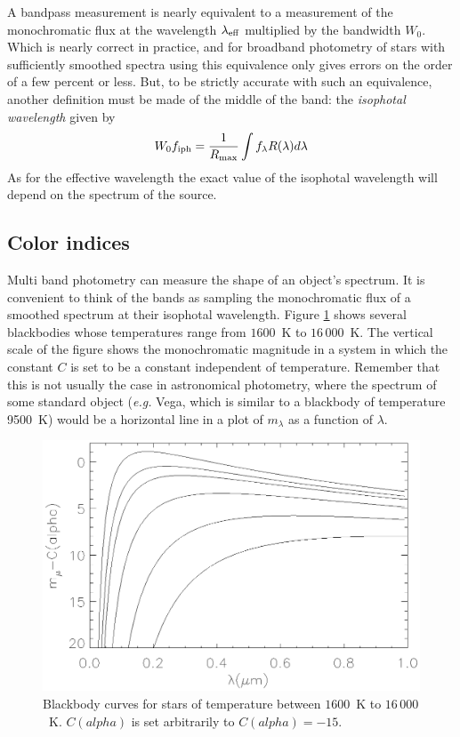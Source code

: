 A bandpass measurement is nearly equivalent to a measurement of the
monochromatic flux at the wavelength $\lambda_{\rm eff}$ multiplied by
the bandwidth $W_0$. Which is nearly correct in practice, and for
broadband photometry of stars with sufficiently smoothed spectra using
this equivalence only gives errors on the order of a few percent or
less. But, to be strictly accurate with such an equivalence, another
definition must be made of the middle of the band: the {\it isophotal
  wavelength} given by
\[
W_0f_{\rm iph}=\frac{1}{R_{\rm max}}\int f_\lambda R(\lambda)d\lambda
\]
As for the effective wavelength the exact value of the isophotal
wavelength will depend on the spectrum of the source. 

\subsection{Color indices}

Multi band photometry can measure the shape of an object's
spectrum. It is convenient to think of the bands as sampling the
monochromatic flux of a smoothed spectrum at their isophotal
wavelength. Figure \ref{fig:color_index} shows several blackbodies
whose temperatures range from $1600$~K to $16\,000$~K. The vertical
scale of the figure shows the monochromatic magnitude in a system in
which the constant $C$ is set to be a constant independent of
temperature. Remember that this is not usually the case in
astronomical photometry, where the spectrum of some standard object
({\it e.g.} Vega, which is similar to a blackbody of temperature
9500~K) would be a horizontal line in a plot of $m_\lambda$ as a
function of $\lambda$. 

\begin{figure}[th!]
  \centering
	\includegraphics[width=\textwidth]{color_index.eps}
  \caption{Blackbody curves for stars of temperature between $1600$~K
    to $16\,000$~K. $C(alpha)$ is set arbitrarily to $C(alpha)=-15$.}
  \label{fig:color_index}
\end{figure}

